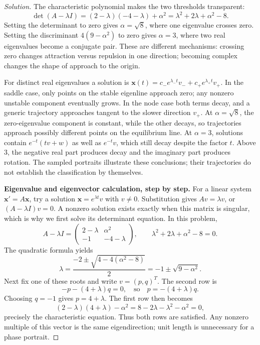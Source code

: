 \documentclass[10pt]{amsart}
\newenvironment{solution}
{\begin{proof}[Solution]}
{\end{proof}}
\begin{document}
\begin{enumerate}[label=\arabic*), leftmargin=*, itemsep=1em]
\begin{solution}
The characteristic polynomial makes the two thresholds transparent:
\[
\det(A-\lambda I)=(2-\lambda)(-4-\lambda)+\alpha^2
=\lambda^2+2\lambda+\alpha^2-8.
\]
Setting the determinant to zero gives $\alpha=\sqrt8$, where one eigenvalue crosses zero. Setting the discriminant $4(9-\alpha^2)$ to zero gives $\alpha=3$, where two real eigenvalues become a conjugate pair. These are different mechanisms: crossing zero changes attraction versus repulsion in one direction; becoming complex changes the shape of approach to the origin.

For distinct real eigenvalues a solution is $\mathbf x(t)=c_-e^{\lambda_-t}v_-+c_+e^{\lambda_+t}v_+$. In the saddle case, only points on the stable eigenline approach zero; any nonzero unstable component eventually grows. In the node case both terms decay, and a generic trajectory approaches tangent to the slower direction $v_+$. At $\alpha=\sqrt8$, the zero-eigenvalue component is constant, while the other decays, so trajectories approach possibly different points on the equilibrium line. At $\alpha=3$, solutions contain $e^{-t}(tv+w)$ as well as $e^{-t}v$, which still decay despite the factor $t$. Above $3$, the negative real part produces decay and the imaginary part produces rotation. The sampled portraits illustrate these conclusions; their trajectories do not establish the classification by themselves.


\medskip\noindent\textbf{Eigenvalue and eigenvector calculation, step by step.}
For a linear system $\mathbf x'=A\mathbf x$, try a solution $\mathbf x=e^{\lambda t}v$ with $v\ne0$. Substitution gives $Av=\lambda v$, or $(A-\lambda I)v=0$. A nonzero solution exists exactly when this matrix is singular, which is why we first solve its determinant equation. In this problem,
\[
A-\lambda I=\begin{pmatrix}2-\lambda&\alpha^2\\-1&-4-\lambda\end{pmatrix},
\qquad \lambda^2+2\lambda+\alpha^2-8=0.
\]
The quadratic formula yields
\[
\lambda=\frac{-2\pm\sqrt{4-4(\alpha^2-8)}}2=-1\pm\sqrt{9-\alpha^2}.
\]
Next fix one of these roots and write $v=(p,q)^T$. The second row is
\[
-p-(4+\lambda)q=0,\quad\text{so}\quad p=-(4+\lambda)q.
\]
Choosing $q=-1$ gives $p=4+\lambda$. The first row then becomes
\[
(2-\lambda)(4+\lambda)-\alpha^2
=8-2\lambda-\lambda^2-\alpha^2=0,
\]
precisely the characteristic equation. Thus both rows are satisfied. Any nonzero multiple of this vector is the same eigendirection; unit length is unnecessary for a phase portrait.


\end{solution}
\end{enumerate}
\end{document}
